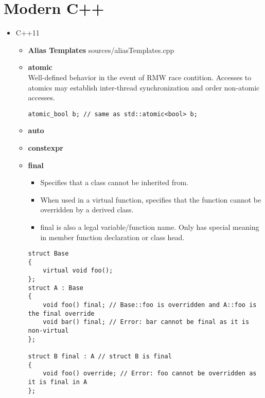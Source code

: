 \documentclass{article}
\begin{document}
\section{Modern C++}
    \begin{itemize}
      \item C++11
        \begin{itemize}
          \item \textbf{Alias Templates}
             {sources/aliasTemplates.cpp}
          \item \textbf{atomic} \\
            Well-defined behavior in the event of RMW race contition. Accesses to atomics may establish inter-thread synchronization and order non-atomic accesses.
            \begin{lstlisting}[style=cpp]
atomic_bool b; // same as std::atomic<bool> b;
         \end{lstlisting}
          \item \textbf{auto}
          \item \textbf{constexpr}
          \item \textbf{final} \\
            \begin{itemize}
              \item Specifies that a class cannot be inherited from.
              \item When used in a virtual function, specifies that the function cannot be overridden by a derived class.
              \item final is also a legal variable/function name. Only has special meaning in member function declaration or class head.
            \end{itemize}
            \begin{lstlisting}[style=cpp]
struct Base
{
    virtual void foo();
};
struct A : Base
{
    void foo() final; // Base::foo is overridden and A::foo is the final override
    void bar() final; // Error: bar cannot be final as it is non-virtual
};
 
struct B final : A // struct B is final
{
    void foo() override; // Error: foo cannot be overridden as it is final in A
};
 

\end{lstlisting}
\end{itemize}
\end{itemize}
\end{document}
